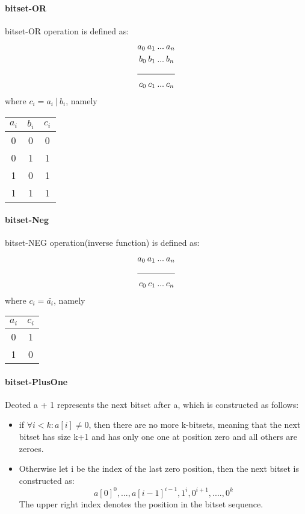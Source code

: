 \documentclass{article}
\begin{document}
			\paragraph{bitset-OR}
			bitset-OR operation is defined as:
			\newline
			\begin{align*}
				a_0 \: a_1 \: ... & \: a_n \\
				b_0 \: b_1 \: ... & \: b_n \\
				 \cline{1-2}
				c_0 \: c_1 \: ... & \: c_n
			\end{align*}
			where $c_i = a_i \: | \: b_i$, namely
			\begin{center}
				\begin{tabular}{cc|c}
					$a_i$ & $b_i$ & $c_i$  \\
					\hline
					0 & 0 & 0 \\
					0 & 1 & 1 \\
					1 & 0 & 1 \\
					1 & 1 & 1 \\
				\end{tabular} 
			\end{center}
			\paragraph{bitset-Neg}
			bitset-NEG operation(inverse function) is defined as:
			\newline
			\begin{align*}
				a_0 \: a_1 \: ... & \: a_n \\
				 \cline{1-2}
				c_0 \: c_1 \: ... & \: c_n
			\end{align*}
			where $c_i = \bar{a_i}$, namely
			\begin{center}
				\begin{tabular}{c|c}
					$a_i$ & $ c_i $ \\
					\hline
					0  & 1 \\
					1 & 0 \\
				\end{tabular} 
			\end{center}
			\paragraph{bitset-PlusOne}
			Deoted a + 1 represents the next bitset after a, which is constructed as follows:
			\begin{itemize}
				\item if $\forall i < k: a[i] \neq 0$, then there are no more k-bitsets, meaning that
					the next bitset has size k+1 and has only one one at position zero and all others are zeroes.
				\item Otherwise let i be the index of the last zero position, then the next bitset is constructed as:
					\begin{equation}
						a[0]^0, ..., a[i-1]^{i-1}, 1^i, 0^{i+1}, ...., 0^k
					\end{equation}
					The upper right index denotes the position in the bitset sequence.
			\end{itemize}
\end{document}
